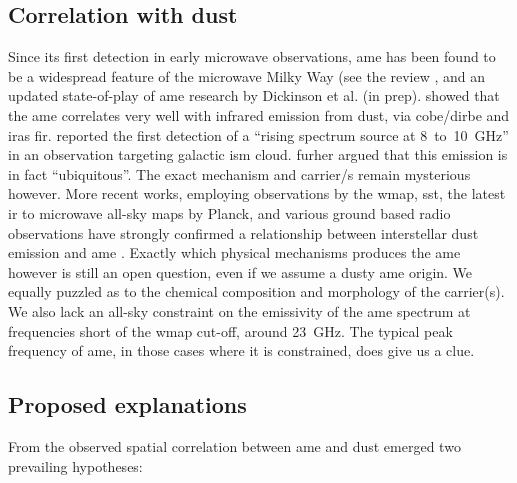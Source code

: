     \subsection{Correlation with dust}
         Since its first detection in early microwave observations, \gls{ame} has been found to be a widespread feature of the microwave Milky Way (see the review \cite{dickinson13r}, and an updated state-of-play of \gls{ame} research by Dickinson et al. (in prep). \cite{kogut96,deoliveiracosta97} showed that the \gls{ame} correlates very well with infrared emission from dust, via \gls{cobe}/\gls{dirbe} and \gls{iras} \gls{fir}.  \cite{finkbeiner02} reported the first detection of a ``rising spectrum source at 8~to~10~GHz'' in an observation targeting galactic \gls{ism} cloud. \cite{deoliveiracosta02} furher argued that this emission is in fact ``ubiquitous''. The exact mechanism and carrier/s remain mysterious however.
        More recent works, employing observations by the \gls{wmap}, \gls{sst}, the latest \gls{ir} to microwave all-sky maps by Planck, and various ground based radio observations have strongly confirmed a relationship between interstellar dust emission and \gls{ame} \citep{ysard10a,tibbs11,hensley16}. Exactly which physical mechanisms produces the \gls{ame} however is still an open question, even if we assume a dusty \gls{ame} origin. We equally puzzled as to the chemical composition and morphology of the carrier(s). We also lack an all-sky constraint on the emissivity of the \gls{ame} spectrum at frequencies short of the \gls{wmap} cut-off, around 23~GHz. The typical peak frequency of \gls{ame}, in those cases where it is constrained, does give us a clue.

  \subsection{Proposed explanations}
     From the observed spatial correlation between \gls{ame} and dust emerged two prevailing hypotheses:

